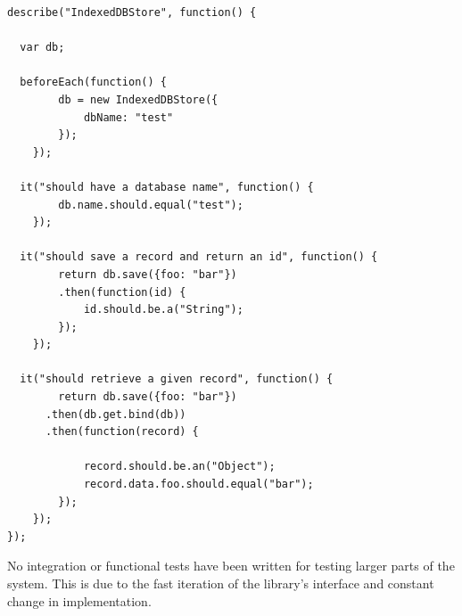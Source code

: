 \begin{Code}
\begin{lstlisting}[caption={Sample test suite}, label={lst:testsuite}]
describe("IndexedDBStore", function() {

  var db;

  beforeEach(function() {
		db = new IndexedDBStore({
			dbName: "test"
		});
	});

  it("should have a database name", function() {
		db.name.should.equal("test");
	});

  it("should save a record and return an id", function() {
		return db.save({foo: "bar"})
		.then(function(id) {
			id.should.be.a("String");
		});
	});

  it("should retrieve a given record", function() {
		return db.save({foo: "bar"})
      .then(db.get.bind(db))
      .then(function(record) {

			record.should.be.an("Object");
			record.data.foo.should.equal("bar");
		});
	});
});
\end{lstlisting}
\end{Code}

No integration or functional tests have been written for testing larger parts of the system. This is due to the fast iteration of the library's interface and constant change in implementation.
